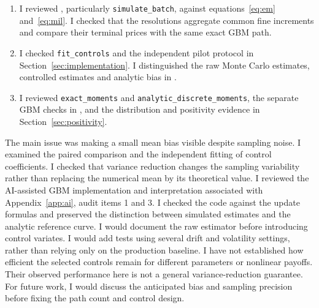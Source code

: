 \begin{enumerate}[leftmargin=2em,itemsep=2pt,topsep=2pt]
\item I reviewed , particularly \texttt{simulate\_batch}, against equations~\eqref{eq:em} and~\eqref{eq:mil}. I checked that the resolutions aggregate common fine increments and compare their terminal prices with the same exact GBM path.
\item I checked \texttt{fit\_controls} and the independent pilot protocol in Section~\ref{sec:implementation}. I distinguished the raw Monte Carlo estimates, controlled estimates and analytic bias in .
\item I reviewed \texttt{exact\_moments} and \texttt{analytic\_discrete\_moments}, the separate GBM checks in , and the distribution and positivity evidence in Section~\ref{sec:positivity}.
\end{enumerate}
The main issue was making a small mean bias visible despite sampling noise. I examined the paired comparison and the independent fitting of control coefficients. I checked that variance reduction changes the sampling variability rather than replacing the numerical mean by its theoretical value.
I reviewed the AI-assisted GBM implementation and interpretation associated with Appendix~\ref{app:ai}, audit items 1 and 3. I checked the code against the update formulas and preserved the distinction between simulated estimates and the analytic reference curve.
I would document the raw estimator before introducing control variates. I would add tests using several drift and volatility settings, rather than relying only on the production baseline.
I have not established how efficient the selected controls remain for different parameters or nonlinear payoffs. Their observed performance here is not a general variance-reduction guarantee.
For future work, I would discuss the anticipated bias and sampling precision before fixing the path count and control design.
\IndividualStatementEnd

